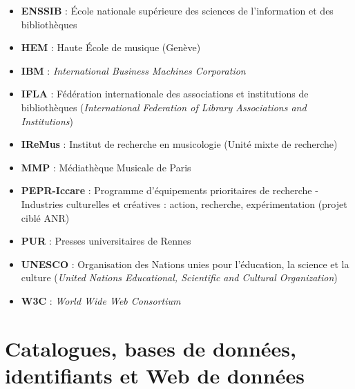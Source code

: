 \begin{itemize}
	\item \textbf{ENSSIB} : École nationale supérieure des sciences de l'information et des bibliothèques
	\item \textbf{HEM} : Haute École de musique (Genève)
	\item \textbf{IBM} : \textit{International Business Machines Corporation}
	\item \textbf{IFLA} : Fédération internationale des associations et institutions de bibliothèques (\textit{International Federation of Library Associations and Institutions})
	\item \textbf{IReMus} : Institut de recherche en musicologie (Unité mixte de recherche)
	\item \textbf{MMP} : Médiathèque Musicale de Paris
	\item \textbf{PEPR-Iccare} : Programme d'équipements prioritaires de recherche - Industries culturelles et créatives :  action, recherche, expérimentation (projet ciblé ANR)
	\item \textbf{PUR} : Presses universitaires de Rennes 
	\item \textbf{UNESCO} : Organisation des Nations unies pour l'éducation, la science et la culture (\textit{United Nations Educational, Scientific and Cultural Organization})
	\item \textbf{W3C} : \textit{World Wide Web Consortium}
\end{itemize}

\section*{Catalogues, bases de données, identifiants et Web de données}

